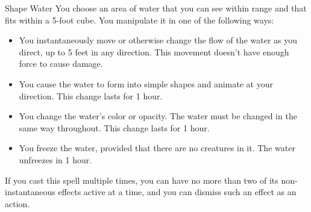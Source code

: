 \begin{Spell}[
  level=Cantrip,
  time=1 Action,
  range={30 ft/5 ft cube},
  components={S},
  duration=Instantaneous,
  school=Transmutation,
  attack=None,
  effect=Control
]{Shape Water}
You choose an area of water that you can see within range and that fits within a 5-foot cube. You manipulate it in one of the following ways:
\begin{itemize}
\setlength{\itemsep}{0em}
\item You instantaneously move or otherwise change the flow of the water as you direct, up to 5 feet in any direction. This movement doesn't have enough force to cause damage.
\item You cause the water to form into simple shapes and animate at your direction. This change lasts for 1 hour.
\item You change the water's color or opacity. The water must be changed in the same way throughout. This change lasts for 1 hour.
\item You freeze the water, provided that there are no creatures in it. The water unfreezes in 1 hour.
\end{itemize}
If you cast this spell multiple times, you can have no more than two of its non-instantaneous effects active at a time, and you can dismiss such an effect as an action.
\end{Spell}
